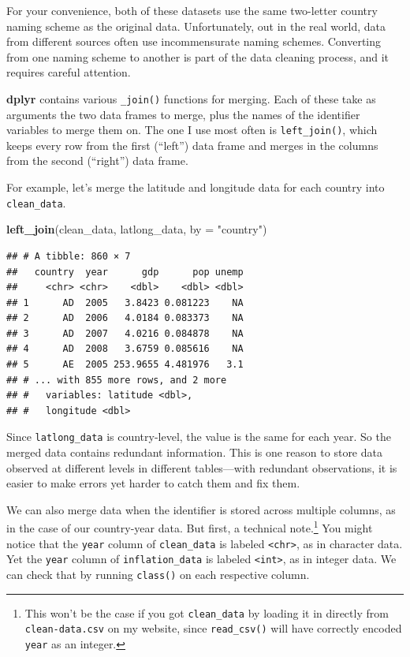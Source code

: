 \documentclass[12pt,oneside,openany]{tufte-book}
\newenvironment{Shaded}{}{}
\newcommand{\KeywordTok}[1]{\textcolor[rgb]{0.00,0.44,0.13}{\textbf{{#1}}}}
\newcommand{\DataTypeTok}[1]{\textcolor[rgb]{0.56,0.13,0.00}{{#1}}}
\newcommand{\StringTok}[1]{\textcolor[rgb]{0.25,0.44,0.63}{{#1}}}
\newcommand{\NormalTok}[1]{{#1}}
\begin{document}
For your convenience, both of these datasets use the same two-letter
country naming scheme as the original data. Unfortunately, out in the
real world, data from different sources often use incommensurate naming
schemes. Converting from one naming scheme to another is part of the
data cleaning process, and it requires careful attention.

\textbf{dplyr} contains various \texttt{\_join()} functions for merging.
Each of these take as arguments the two data frames to merge, plus the
names of the identifier variables to merge them on. The one I use most
often is \texttt{left\_join()}, which keeps every row from the first
(``left'') data frame and merges in the columns from the second
(``right'') data frame.

For example, let's merge the latitude and longitude data for each
country into \texttt{clean\_data}.

\begin{Shaded}
\begin{Highlighting}[]
\KeywordTok{left_join}\NormalTok{(clean_data, latlong_data, }\DataTypeTok{by =} \StringTok{"country"}\NormalTok{)}
\end{Highlighting}
\end{Shaded}

\begin{verbatim}
## # A tibble: 860 × 7
##   country  year      gdp      pop unemp
##     <chr> <chr>    <dbl>    <dbl> <dbl>
## 1      AD  2005   3.8423 0.081223    NA
## 2      AD  2006   4.0184 0.083373    NA
## 3      AD  2007   4.0216 0.084878    NA
## 4      AD  2008   3.6759 0.085616    NA
## 5      AE  2005 253.9655 4.481976   3.1
## # ... with 855 more rows, and 2 more
## #   variables: latitude <dbl>,
## #   longitude <dbl>
\end{verbatim}

Since \texttt{latlong\_data} is country-level, the value is the same for
each year. So the merged data contains redundant information. This is
one reason to store data observed at different levels in different
tables---with redundant observations, it is easier to make errors yet
harder to catch them and fix them.

We can also merge data when the identifier is stored across multiple
columns, as in the case of our country-year data. But first, a technical
note.\footnote{This won't be the case if you got \texttt{clean\_data} by
  loading it in directly from \texttt{clean-data.csv} on my website,
  since \texttt{read\_csv()} will have correctly encoded \texttt{year}
  as an integer.} You might notice that the \texttt{year} column of
\texttt{clean\_data} is labeled \texttt{\textless{}chr\textgreater{}},
as in character data. Yet the \texttt{year} column of
\texttt{inflation\_data} is labeled
\texttt{\textless{}int\textgreater{}}, as in integer data. We can check
that by running \texttt{class()} on each respective column.
\end{document}
